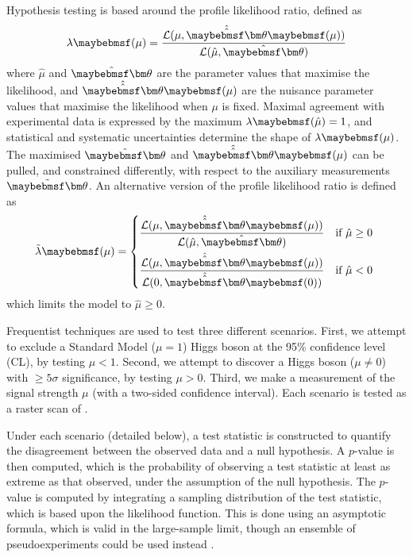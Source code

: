 Hypothesis testing is based around the profile likelihood ratio, defined as
\begin{equation}
	\lambda\parenths{\mu} = \frac{\mathcal{L}(\mu, \hat{\hat{\bvec{\theta}}}\parenths{\mu})}{\mathcal{L}(\hat{\mu}, \hat{\bvec{\theta}})}
\end{equation}
where $\hat{\mu}$ and $\hat{\bvec{\theta}}$ are the parameter values that maximise the 
likelihood, and $\hat{\hat{\bvec{\theta}}}\parenths{\mu}$ are the nuisance parameter values 
that maximise the likelihood when $\mu$ is fixed. Maximal agreement with experimental data 
is expressed by the maximum $\lambda\parenths{\hat{\mu}} = 1$, and statistical and 
systematic uncertainties determine the shape of $\lambda\parenths{\mu}$. The maximised 
$\hat{\bvec{\theta}}$ and $\hat{\hat{\bvec{\theta}}}\parenths{\mu}$ can be pulled, and 
constrained differently, with respect to the auxiliary measurements $\tilde{\bvec{\theta}}$. 
An alternative version of the profile likelihood ratio is defined as
\begin{equation}
	\tilde{\lambda}\parenths{\mu} = 
	\begin{dcases*}
		\frac{\mathcal{L}(\mu, \hat{\hat{\bvec{\theta}}}\parenths{\mu})}{\mathcal{L}(\hat{\mu}, \hat{\bvec{\theta}})} & if $\hat{\mu} \geq 0$ \\
		\frac{\mathcal{L}(\mu, \hat{\hat{\bvec{\theta}}}\parenths{\mu})}{\mathcal{L}(0, \hat{\hat{\bvec{\theta}}}\parenths{0})} & if $\hat{\mu} < 0$
	\end{dcases*}
\end{equation}
which limits the model to $\hat{\mu} \geq 0$.

Frequentist techniques are used to test three different scenarios. First, we attempt to 
exclude a Standard Model (\ie $\mu = 1$) Higgs boson at the 95\% confidence level (CL), by 
testing $\mu < 1$. Second, we attempt to discover a Higgs boson (\ie $\mu \neq 0$) with 
$\geq\!5\sigma$ significance, by testing $\mu > 0$. Third, we make a measurement of the 
signal strength $\mu$ (with a two-sided confidence interval). Each scenario is tested as 
a raster scan of \mH.

Under each scenario (detailed below), a test statistic is constructed to quantify the 
disagreement between the observed data and a null hypothesis. A $p$-value is then 
computed, which is the probability of observing a test statistic at least as extreme as that 
observed, under the assumption of the null hypothesis. The $p$-value is computed by 
integrating a sampling distribution of the test statistic, which is based upon the 
likelihood function. This is done using an asymptotic formula, which is valid in the 
large-sample limit, though an ensemble of pseudoexperiments could be used instead 
\cite{Cowan:2010}. 

